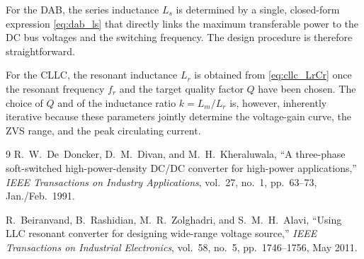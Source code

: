 \documentclass[a4paper, 11pt]{article}
\begin{document}
	For the DAB, the series inductance $L_s$ is determined by a single,
	closed-form expression \eqref{eq:dab_ls} that directly links the
	maximum transferable power to the DC bus voltages and the switching
	frequency.  The design procedure is therefore straightforward.
	
	For the CLLC, the resonant inductance $L_r$ is obtained from
	\eqref{eq:cllc_LrCr} once the resonant frequency $f_r$ and the target
	quality factor $Q$ have been chosen.  The choice of $Q$ and of the
	inductance ratio $k = L_m/L_r$ is, however, inherently iterative
	because these parameters jointly determine the voltage-gain curve, the
	ZVS range, and the peak circulating current.
	
	\begin{thebibliography}{9}
		R.~W.~De~Doncker, D.~M.~Divan, and M.~H.~Kheraluwala,
		``A three-phase soft-switched high-power-density DC/DC converter
		for high-power applications,''
		\emph{IEEE Transactions on Industry Applications},
		vol.~27, no.~1, pp.~63--73, Jan./Feb.\ 1991.
		
		R.~Beiranvand, B.~Rashidian, M.~R.~Zolghadri, and
		S.~M.~H.~Alavi,
		``Using LLC resonant converter for designing wide-range voltage
		source,''
		\emph{IEEE Transactions on Industrial Electronics},
		vol.~58, no.~5, pp.~1746--1756, May 2011.
	\end{thebibliography}
	
\end{document}
